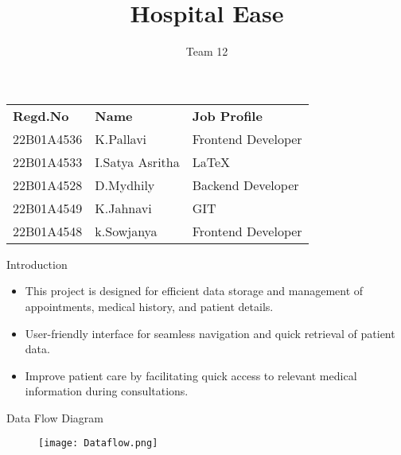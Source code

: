\documentclass{beamer}
\title{Hospital Ease}
\author[Team-12]{Team 12}
\date{}
\begin{document}
\begin{frame}
 \titlepage
\vspace*{-1.5cm}
     \begin{table}
        \centering
        \begin{tabular}{l l l }
            { \small \textbf{Regd.No}} & {\textbf{\small  Name}} & {\textbf{\small Job Profile}} \\
           \small 22B01A4536 & \small  K.Pallavi & \small  Frontend Developer \\
            \small 22B01A4533 & \small  I.Satya Asritha& \small LaTeX \\
            \small 22B01A4528 & \small  D.Mydhily & \small Backend Developer \\
            \small 22B01A4549 & \small  K.Jahnavi & \small GIT\\
            \small 22B01A4548& \small  k.Sowjanya & \small Frontend Developer\\
           
        \end{tabular}
    \end{table}
\end{frame}





\begin{frame}{Introduction}
\begin{itemize}
    \item This project is  designed for efficient data storage and management of appointments, medical history, and patient details.
\vspace*{2mm}
    \item User-friendly interface for seamless navigation and quick retrieval of patient data.
\vspace*{2mm}
    \item Improve patient care by facilitating quick access to relevant medical information during consultations.
\end{itemize}
\end{frame}



\begin{frame}{Data Flow Diagram}
\vspace*{-2mm}
  \begin{figure}
    \centering
    \texttt{[image: Dataflow.png]} 
\end{figure}
\end{frame}
\end{document}
